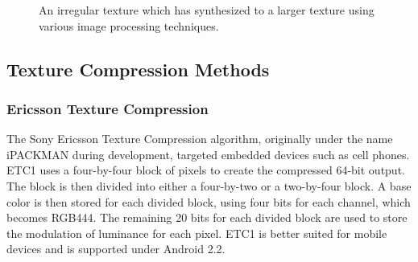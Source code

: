\documentclass[12pt]{article}
\begin{document}
\begin{figure}[!htbp]
   \begin{center}
   \caption{An irregular texture which has synthesized to a larger texture using various image processing techniques.}
   \end{center}
\end{figure}

\subsection{Texture Compression Methods}
\subsubsection{Ericsson Texture Compression}
The Sony Ericsson Texture Compression algorithm, originally under the name iPACKMAN during development, targeted embedded devices such as cell phones. ETC1 uses a four-by-four block of pixels to create the compressed 64-bit output. The block is then divided into either a four-by-two or a two-by-four block. A base color is then stored for each divided block, using four bits for each channel, which becomes RGB444. The remaining 20 bits for each divided block are used to store
 the modulation of luminance for each pixel. ETC1 is better suited for mobile devices and is supported under Android 2.2.
\end{document}
